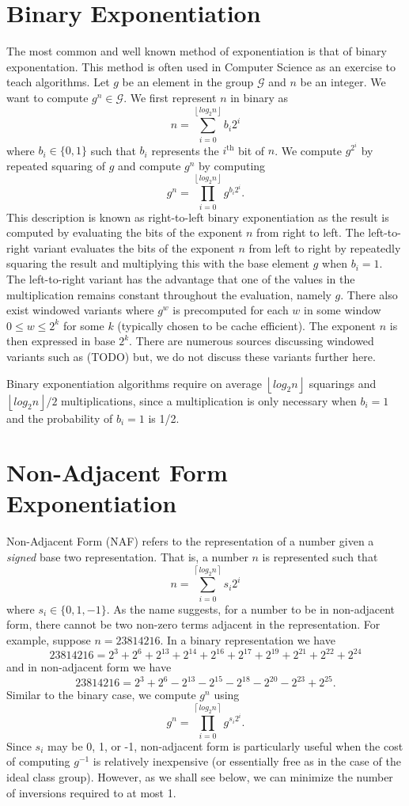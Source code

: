 \documentclass{ucalgthes1}
\theoremstyle{plain}
\theoremstyle{definition}
\newcommand{\floor}[1]{\left\lfloor #1 \right\rfloor}
\newcommand{\ceil}[1]{\left\lceil #1 \right\rceil}
\begin{document}
\section{Binary Exponentiation}\label{section:binary}
The most common and well known method of exponentiation is that of binary exponentation.  This method is often used in Computer Science as an exercise to teach algorithms.  Let $g$ be an element in the group $\mathcal G$ and $n$ be an integer.  We want to compute $g^n \in \mathcal G$.  We first represent $n$ in binary as
\[
	n = \sum_{i=0}^{\floor{log_2 n}} b_i 2^i
\]
where $b_i \in \{0, 1\}$ such that $b_i$ represents the $i^{\textrm{th}}$ bit of $n$.   We compute $g^{2^i}$ by repeated squaring of $g$ and compute $g^n$ by computing
\[
	g^n = \prod_{i=0}^{\floor{log_2 n}} g^{b_i 2^i}.
\]
This description is known as right-to-left binary exponentiation as the result is computed by evaluating the bits of the exponent $n$ from right to left.  The left-to-right variant evaluates the bits of the exponent $n$ from left to right by repeatedly squaring the result and multiplying this with the base element $g$ when $b_i = 1$.  The left-to-right variant has the advantage that one of the values in the multiplication remains constant throughout the evaluation, namely $g$.  There also exist windowed variants where $g^w$ is precomputed for each $w$ in some window $0 \le w \le 2^k$ for some $k$ (typically chosen to be cache efficient). The exponent $n$ is then expressed in base $2^k$.  There are numerous sources discussing windowed variants such as (TODO) but, we do not discuss these variants further here.

Binary exponentiation algorithms require on average $\floor{log_2 n}$ squarings and $\floor{log_2 n}/2$ multiplications, since a multiplication is only necessary when $b_i = 1$ and the probability of $b_i = 1$ is 1/2.

\bigbreak
\section{Non-Adjacent Form Exponentiation}\label{section:naf}

Non-Adjacent Form (NAF) refers to the representation of a number given a \emph{signed} base two representation.  That is, a number $n$ is represented such that
\[
	n = \sum_{i=0}^{\ceil{log_2 n}} s_i 2^i
\]
where $s_i \in \{0, 1, -1\}$.  As the name suggests, for a number to be in non-adjacent form, there cannot be two non-zero terms adjacent in the representation.  For example, suppose $n = 23814216$.  In a binary representation we have
\[
	23814216 = 2^3+2^6+2^{13}+2^{14}+2^{16}+2^{17}+2^{19}+2^{21}+2^{22}+2^{24}
\]
and in non-adjacent form we have
\[
	23814216 = 2^3+2^6-2^{13}-2^{15}-2^{18}-2^{20}-2^{23}+2^{25}.
\]
Similar to the binary case, we compute $g^n$ using
\[
	g^n = \prod _{i=0}^{\ceil{log_2 n}} g^{s_i 2^i}.
\]
Since $s_i$ may be 0, 1, or -1, non-adjacent form is particularly useful when the cost of computing $g^{-1}$ is relatively inexpensive (or essentially free as in the case of the ideal class group).  However, as we shall see below, we can minimize the number of inversions required to at most 1.
\end{document}

